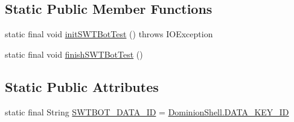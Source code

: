 \subsection*{\-Static \-Public \-Member \-Functions}
\begin{DoxyCompactItemize}
\item 
static final void \hyperlink{classdominion_1_1view_1_1utils_1_1SWTBotBase_ad2a6b6ebaf6c92640f97ae1337a23363}{init\-S\-W\-T\-Bot\-Test} ()  throws I\-O\-Exception 
\item 
static final void \hyperlink{classdominion_1_1view_1_1utils_1_1SWTBotBase_a0b35cbc3ed1b0c49d6c51b5b233e9f7f}{finish\-S\-W\-T\-Bot\-Test} ()
\end{DoxyCompactItemize}
\subsection*{\-Static \-Public \-Attributes}
\begin{DoxyCompactItemize}
\item 
static final \-String \hyperlink{classdominion_1_1view_1_1utils_1_1SWTBotBase_aeccf7dd5fa6e2b5042503c28fad11774}{\-S\-W\-T\-B\-O\-T\-\_\-\-D\-A\-T\-A\-\_\-\-I\-D} = \hyperlink{classdominion_1_1view_1_1DominionShell_af14f58f7caf70ec91889ce707dc32855}{\-Dominion\-Shell.\-D\-A\-T\-A\-\_\-\-K\-E\-Y\-\_\-\-I\-D}
\end{DoxyCompactItemize}
